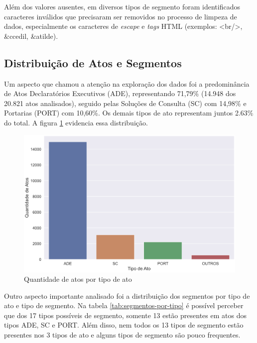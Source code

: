 Além dos valores ausentes, em diversos tipos de segmento foram identificados caracteres inválidos que precisaram ser removidos no processo de limpeza de dados, especialmente os caracteres de \textit{escape} e \textit{tags} HTML (exemplos: <br/>, \&ccedil, \&atilde).

\subsection{Distribuição de Atos e Segmentos}

Um aspecto que chamou a atenção na exploração dos dados foi a predominância de Atos Declaratórios Executivos (ADE), representando 71,79\% (14.948 dos 20.821 atos analisados), seguido pelas Soluções de Consulta (SC) com 14,98\% e Portarias (PORT) com 10,60\%. Os demais tipos de ato representam juntos 2.63\% do total. A figura \ref{fig:atos-por-tipo-ato} evidencia essa distribuição.

\begin{figure}[h]
	\caption{Quantidade de atos por tipo de ato}
	\center
	\label{fig:atos-por-tipo-ato}
	\includegraphics[scale=1.9]{exploratoria/atos-por-tipo-ato.png}
	\fdp
\end{figure}

Outro aspecto importante analisado foi a distribuição dos segmentos por tipo de ato e tipo de segmento. Na tabela \ref{tab:segmentos-por-tipo} é possível perceber que dos 17 tipos possíveis de segmento, somente 13 estão presentes em atos dos tipos ADE, SC e PORT. Além disso, nem todos os 13 tipos de segmento estão presentes nos 3 tipos de ato e alguns tipos de segmento são pouco frequentes.

